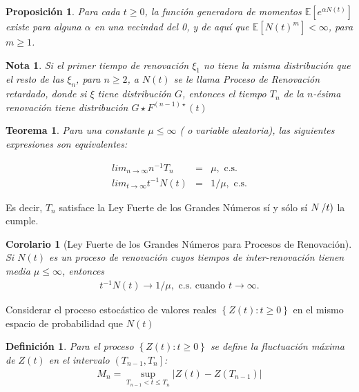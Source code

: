 \documentclass{article}
\newtheorem{Def}{Definición}
\newtheorem{Teo}{Teorema}
\newtheorem{Note}{Nota}
\newtheorem{Prop}{Proposición}
\newtheorem{Coro}{Corolario}
\newcommand{\esp}{\mathbb{E}}
\begin{document}
\begin{Prop}
Para cada $t\geq0$, la funci\'on generadora de momentos $\esp\left[e^{\alpha N\left(t\right)}\right]$ existe para alguna $\alpha$ en una vecindad del 0, y de aqu\'i que $\esp\left[N\left(t\right)^{m}\right]<\infty$, para $m\geq1$.
\end{Prop}


\begin{Note}
Si el primer tiempo de renovaci\'on $\xi_{1}$ no tiene la misma distribuci\'on que el resto de las $\xi_{n}$, para $n\geq2$, a $N\left(t\right)$ se le llama Proceso de Renovaci\'on retardado, donde si $\xi$ tiene distribuci\'on $G$, entonces el tiempo $T_{n}$ de la $n$-\'esima renovaci\'on tiene distribuci\'on $G\star F^{\left(n-1\right)\star}\left(t\right)$
\end{Note}


\begin{Teo}
Para una constante $\mu\leq\infty$ ( o variable aleatoria), las siguientes expresiones son equivalentes:

\begin{eqnarray}
lim_{n\rightarrow\infty}n^{-1}T_{n}&=&\mu,\textrm{ c.s.}\\
lim_{t\rightarrow\infty}t^{-1}N\left(t\right)&=&1/\mu,\textrm{ c.s.}
\end{eqnarray}
\end{Teo}


Es decir, $T_{n}$ satisface la Ley Fuerte de los Grandes N\'umeros s\'i y s\'olo s\'i $N\left/t\right)$ la cumple.


\begin{Coro}[Ley Fuerte de los Grandes N\'umeros para Procesos de Renovaci\'on]
Si $N\left(t\right)$ es un proceso de renovaci\'on cuyos tiempos de inter-renovaci\'on tienen media $\mu\leq\infty$, entonces
\begin{eqnarray}
t^{-1}N\left(t\right)\rightarrow 1/\mu,\textrm{ c.s. cuando }t\rightarrow\infty.
\end{eqnarray}

\end{Coro}


Considerar el proceso estoc\'astico de valores reales $\left\{Z\left(t\right):t\geq0\right\}$ en el mismo espacio de probabilidad que $N\left(t\right)$

\begin{Def}
Para el proceso $\left\{Z\left(t\right):t\geq0\right\}$ se define la fluctuaci\'on m\'axima de $Z\left(t\right)$ en el intervalo $\left(T_{n-1},T_{n}\right]$:
\begin{eqnarray*}
M_{n}=\sup_{T_{n-1}<t\leq T_{n}}|Z\left(t\right)-Z\left(T_{n-1}\right)|
\end{eqnarray*}
\end{Def}
\end{document}
